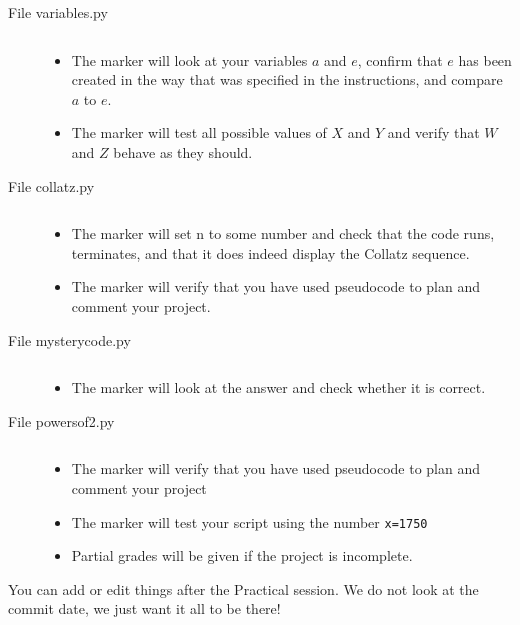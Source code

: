 \documentclass[pdflatex,a4paper]{article}
\begin{document}
\begin{description}
\item[File variables.py] $\;$\\
\begin{itemize}
\item
The marker will look at your variables \(a\) and \(e\),  confirm that \(e\) has been created in the way that was specified in the instructions, and compare \(a\) to \(e\).
\item
The marker will test all possible values of \(X\) and \(Y\) and verify that \(W\) and \(Z\) behave as they should.
\end{itemize}

\item[File collatz.py] $\;$\\

\begin{itemize}
\item
The marker will set n to some number and check that the code runs, terminates, and that it does indeed display the Collatz sequence. 
\item
The marker will verify that you have used pseudocode to plan and comment your project. 
\end{itemize}


\item[File mysterycode.py] $\;$\\

\begin{itemize}
\item
The marker will look at the answer and check whether it is correct.
\end{itemize}



\item[File powersof2.py] $\;$\\

\begin{itemize}
\item
The marker will verify that you have used pseudocode to plan and comment your project
\item
The marker will test your script using the number \verb_x=1750_  
\item
Partial grades will be given if the project is incomplete.
\end{itemize}


\end{description}



You can add or edit things after the Practical session. We do not look at the commit date, we just want it all to be there!
\end{document}

